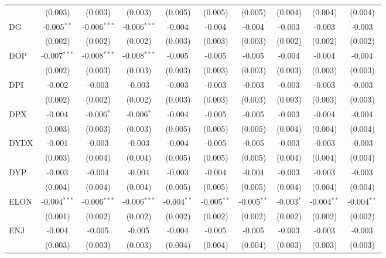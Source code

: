 \begin{table}[!htbp]
\begin{tabular}{@{\extracolsep{5pt}}lccccccccc}
  & (0.003) & (0.003) & (0.003) & (0.005) & (0.005) & (0.005) & (0.004) & (0.004) & (0.004) \\
 DG & -0.005$^{**}$ & -0.006$^{***}$ & -0.006$^{***}$ & -0.004$^{}$ & -0.004$^{}$ & -0.004$^{}$ & -0.003$^{}$ & -0.003$^{}$ & -0.003$^{}$ \\
  & (0.002) & (0.002) & (0.002) & (0.003) & (0.003) & (0.003) & (0.002) & (0.002) & (0.002) \\
 DOP & -0.007$^{***}$ & -0.008$^{***}$ & -0.008$^{***}$ & -0.005$^{}$ & -0.005$^{}$ & -0.005$^{}$ & -0.004$^{}$ & -0.004$^{}$ & -0.004$^{}$ \\
  & (0.002) & (0.003) & (0.003) & (0.003) & (0.003) & (0.003) & (0.003) & (0.003) & (0.003) \\
 DPI & -0.002$^{}$ & -0.003$^{}$ & -0.003$^{}$ & -0.003$^{}$ & -0.003$^{}$ & -0.003$^{}$ & -0.003$^{}$ & -0.003$^{}$ & -0.003$^{}$ \\
  & (0.002) & (0.002) & (0.002) & (0.003) & (0.003) & (0.003) & (0.003) & (0.003) & (0.003) \\
 DPX & -0.004$^{}$ & -0.006$^{*}$ & -0.006$^{*}$ & -0.004$^{}$ & -0.005$^{}$ & -0.005$^{}$ & -0.003$^{}$ & -0.004$^{}$ & -0.004$^{}$ \\
  & (0.003) & (0.003) & (0.003) & (0.005) & (0.005) & (0.005) & (0.004) & (0.004) & (0.004) \\
 DYDX & -0.001$^{}$ & -0.003$^{}$ & -0.003$^{}$ & -0.004$^{}$ & -0.005$^{}$ & -0.005$^{}$ & -0.003$^{}$ & -0.003$^{}$ & -0.003$^{}$ \\
  & (0.003) & (0.004) & (0.004) & (0.005) & (0.005) & (0.005) & (0.004) & (0.004) & (0.004) \\
 DYP & -0.003$^{}$ & -0.004$^{}$ & -0.004$^{}$ & -0.003$^{}$ & -0.004$^{}$ & -0.004$^{}$ & -0.003$^{}$ & -0.003$^{}$ & -0.003$^{}$ \\
  & (0.004) & (0.004) & (0.004) & (0.005) & (0.005) & (0.005) & (0.004) & (0.004) & (0.004) \\
 ELON & -0.004$^{***}$ & -0.006$^{***}$ & -0.006$^{***}$ & -0.004$^{**}$ & -0.005$^{**}$ & -0.005$^{**}$ & -0.003$^{*}$ & -0.004$^{**}$ & -0.004$^{**}$ \\
  & (0.001) & (0.002) & (0.002) & (0.002) & (0.002) & (0.002) & (0.002) & (0.002) & (0.002) \\
 ENJ & -0.004$^{}$ & -0.005$^{}$ & -0.005$^{}$ & -0.004$^{}$ & -0.005$^{}$ & -0.005$^{}$ & -0.003$^{}$ & -0.003$^{}$ & -0.003$^{}$ \\
  & (0.003) & (0.003) & (0.003) & (0.004) & (0.004) & (0.004) & (0.003) & (0.003) & (0.003) \\

\end{tabular}
\end{table}
